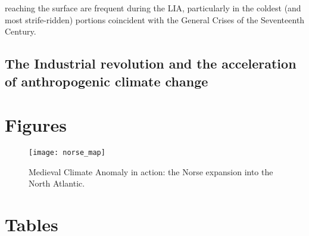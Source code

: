 \documentclass[amstex,12pt]{book}
\begin{document}
reaching the surface are frequent during the LIA, particularly in the coldest (and most strife-ridden) portions coincident with the General Crises of the Seventeenth Century. \\

   
\subsection{The Industrial revolution and the acceleration of anthropogenic climate change}

\clearpage 
\section{Figures} \label{Figures}

\begin{figure}
\begin{center}
	\texttt{[image: norse\_map]}%
	\caption{Medieval Climate Anomaly in action: the Norse expansion into the North Atlantic.}
	\label{fig:norse_map}
\end{center}
\end{figure}

\clearpage 
\section{Tables}  \label{Tables}
\end{document}
